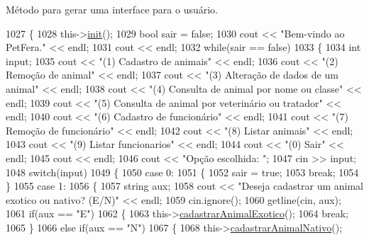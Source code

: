Método para gerar uma interface para o usuário. 


\begin{DoxyCode}
1027 \{
1028     this->\hyperlink{classPetFera_a9fdb130a8f1da55ef04e51e01741c87b}{init}();
1029     \textcolor{keywordtype}{bool} sair = \textcolor{keyword}{false};
1030     cout << \textcolor{stringliteral}{"Bem-vindo ao PetFera."} << endl;
1031     cout << endl;
1032     \textcolor{keywordflow}{while}(sair == \textcolor{keyword}{false})
1033     \{
1034         \textcolor{keywordtype}{int} input;
1035         cout << \textcolor{stringliteral}{"(1) Cadastro de animais"} << endl;
1036         cout << \textcolor{stringliteral}{"(2) Remoção de animal"} << endl;
1037         cout << \textcolor{stringliteral}{"(3) Alteração de dados de um animal"} << endl;
1038         cout << \textcolor{stringliteral}{"(4) Consulta de animal por nome ou classe"} << endl;
1039         cout << \textcolor{stringliteral}{"(5) Consulta de animal por veterinário ou tratador"} << endl;
1040         cout << \textcolor{stringliteral}{"(6) Cadastro de funcionário"} << endl;
1041         cout << \textcolor{stringliteral}{"(7) Remoção de funcionário"} << endl;
1042         cout << \textcolor{stringliteral}{"(8) Listar animais"} << endl;
1043         cout << \textcolor{stringliteral}{"(9) Listar funcionarios"} << endl;
1044         cout << \textcolor{stringliteral}{"(0) Sair"} << endl;
1045         cout << endl;
1046         cout << \textcolor{stringliteral}{"Opção escolhida: "};
1047         cin >> input;
1048         \textcolor{keywordflow}{switch}(input)
1049         \{
1050             \textcolor{keywordflow}{case} 0:
1051             \{
1052                 sair = \textcolor{keyword}{true};
1053                 \textcolor{keywordflow}{break};
1054             \}
1055             \textcolor{keywordflow}{case} 1:
1056             \{
1057                 \textcolor{keywordtype}{string} aux;
1058                 cout << \textcolor{stringliteral}{"Deseja cadastrar um animal exotico ou nativo? (E/N)"} << endl;
1059                 cin.ignore();
1060                 getline(cin, aux);
1061                 \textcolor{keywordflow}{if}(aux == \textcolor{stringliteral}{"E"})
1062                 \{
1063                     this->\hyperlink{classPetFera_aa095a83bf3fe053b094020a6b7049f66}{cadastrarAnimalExotico}();
1064                     \textcolor{keywordflow}{break};
1065                 \}
1066                 \textcolor{keywordflow}{else} \textcolor{keywordflow}{if}(aux == \textcolor{stringliteral}{"N"})
1067                 \{
1068                     this->\hyperlink{classPetFera_ac42995494bfa5873d92e8391d1002f1a}{cadastrarAnimalNativo}();

\end{DoxyCode}
